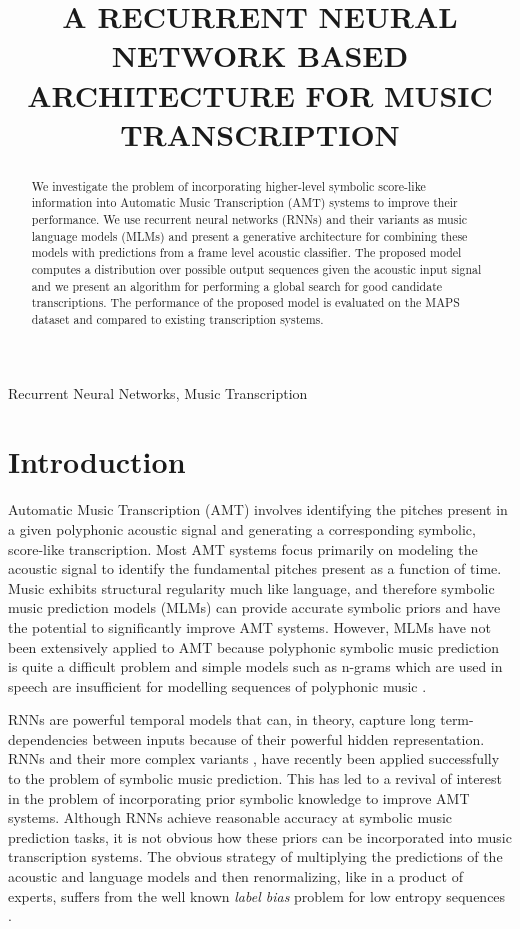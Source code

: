\documentclass{article}
\title{A RECURRENT NEURAL NETWORK BASED ARCHITECTURE FOR MUSIC TRANSCRIPTION}
\begin{document}
\ninept
%
\maketitle
%
\begin{abstract}
We investigate the problem of incorporating higher-level symbolic score-like information into Automatic Music Transcription (AMT) systems to improve their performance. We use recurrent neural networks (RNNs) and their variants as music language models (MLMs) and present a generative architecture for combining these models with predictions from a frame level acoustic classifier. The proposed model computes a distribution over possible output sequences given the acoustic input signal and we present an algorithm for performing a global search for good candidate transcriptions. The performance of the proposed model is evaluated on the MAPS dataset and compared to existing transcription systems. 
\end{abstract}
%
\begin{keywords}
Recurrent Neural Networks, Music Transcription
\end{keywords}
%
\section{Introduction}
\label{sec:intro} 

Automatic Music Transcription (AMT) involves identifying the pitches present in a given polyphonic acoustic signal and generating a corresponding symbolic, score-like transcription. Most AMT systems focus primarily on modeling the acoustic signal to identify the fundamental pitches present as a function of time. Music exhibits structural regularity much like language, and therefore symbolic music prediction models (MLMs) can provide accurate symbolic priors and have the potential to significantly improve AMT systems. However, MLMs have not been extensively applied to AMT because polyphonic symbolic music prediction is quite a difficult problem and simple models such as n-grams which are used in speech are insufficient for modelling sequences of polyphonic music \cite{boulanger2012modeling}. 

RNNs are powerful temporal models that can, in theory, capture long term-dependencies between inputs because of their powerful hidden representation. RNNs and their more complex variants \cite{boulanger2012modeling}, have recently been applied successfully to the problem of symbolic music prediction. This has led to a revival of interest in the problem of incorporating prior symbolic knowledge to improve AMT systems. Although RNNs achieve reasonable accuracy at symbolic music prediction tasks, it is not obvious how these priors can be incorporated into music transcription systems. The obvious strategy of multiplying the predictions of the acoustic and language models and then renormalizing, like in a product of experts, suffers from the well known \emph{label bias} problem for low entropy sequences \cite{Lafferty:2001:CRF:645530.655813}. 
\end{document}
